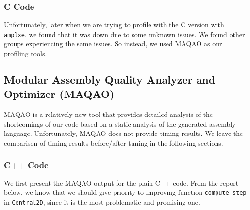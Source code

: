 \documentclass[12pt]{article}
\numberwithin{equation}{section}
\begin{document}
\subsubsection{C Code}

\normalsize
Unfortunately, later when we are trying to profile with the C version with \texttt{amplxe}, we found that it was down due to some unknown issues. We found other groups experiencing the same issues. So instead, we used MAQAO as our profiling tools.

\subsection{Modular Assembly Quality Analyzer and Optimizer (MAQAO)}

MAQAO is a relatively new tool that provides detailed analysis of the shortcomings of our code based on a static analysis of the generated assembly language. Unfortunately, MAQAO does not provide timing results. We leave the comparison of timing results before/after tuning in the following sections.

\subsubsection{C++ Code}

We first present the MAQAO output for the plain C++ code.
From the report below, we know that we should give priority to improving function \texttt{compute\_step} in \texttt{Central2D}, since it is the most problematic and promising one.
\end{document}
